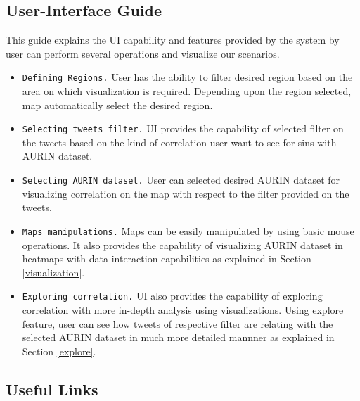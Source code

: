 \subsection{User-Interface Guide}
This guide explains the UI capability and features provided by the system by user can perform several operations and visualize our scenarios.

\begin{itemize}
    \item \texttt{Defining Regions.} User has the ability to filter desired region based on the area on which visualization is required. Depending upon the region selected, map automatically select the desired region.
    
    \item \texttt{Selecting tweets filter.} UI provides the capability of selected filter on the tweets based on the kind of correlation user want to see for sins with AURIN dataset.
    
    \item \texttt{Selecting AURIN dataset.} User can selected desired AURIN dataset for visualizing correlation on the map with respect to the filter provided on the tweets.
    
    \item \texttt{Maps manipulations.} Maps can be easily manipulated by using basic mouse operations. It also provides the capability of visualizing AURIN dataset in heatmaps with data interaction capabilities as explained in Section \ref{visualization}.
    
    \item \texttt{Exploring correlation.} UI also provides the capability of exploring correlation with more in-depth analysis using visualizations. Using explore feature, user can see how tweets of respective filter are relating with the selected AURIN dataset in much more detailed mannner as explained in Section \ref{explore}.
    
\end{itemize}

\subsection{Useful Links}

